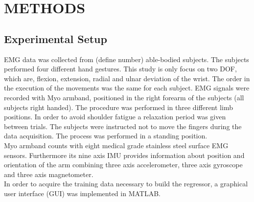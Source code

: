 \documentclass[a4paper, 10pt, conference]{ieeeconf}      %
\begin{document}
	\section{METHODS}
	
	\subsection{Experimental Setup}
EMG data was collected from (define number) able-bodied subjects. The subjects performed four different hand gestures. This study is only focus on two DOF, which are, flexion, extension, radial and ulnar deviation of the wrist. The order in the execution of the movements was the same for each subject. EMG signals were recorded with Myo armband, positioned in the right forearm of the subjects (all subjects right handed). The procedure was performed in three different limb positions. In order to avoid shoulder fatigue a relaxation period was given between trials. The subjects were instructed not to move the fingers during the data acquisition. The process was performed in a standing position. \\ %
 Myo armband counts with eight medical grade stainless steel surface EMG sensors. %
 Furthermore its nine axis IMU provides information about position and orientation of the arm combining three axis accelerometer, three axis gyroscope and three axis magnetometer.\\   
 In order to acquire the training data necessary to build the regressor, a graphical user interface (GUI) was implemented in MATLAB. %
\end{document}
